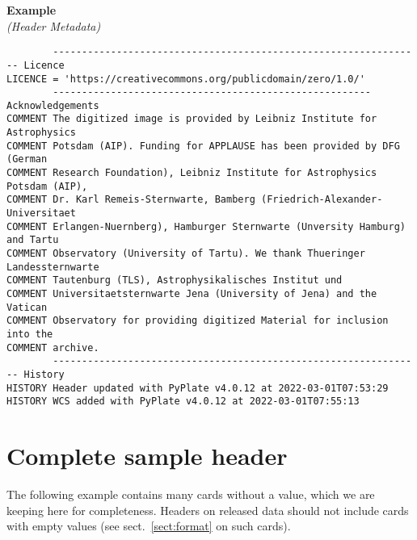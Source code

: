 \documentclass[11pt]{ivoa}
\newenvironment{fitsexample}[1]
{\bigskip\noindent\textbf{Example}\\\textit{(#1)\smallskip}}
{\medskip}
\begin{document}
\begin{fitsexample}{Header Metadata}
\begin{lstlisting}
        ---------------------------------------------------------------- Licence
LICENCE = 'https://creativecommons.org/publicdomain/zero/1.0/'
        ------------------------------------------------------- Acknowledgements
COMMENT The digitized image is provided by Leibniz Institute for Astrophysics
COMMENT Potsdam (AIP). Funding for APPLAUSE has been provided by DFG (German
COMMENT Research Foundation), Leibniz Institute for Astrophysics Potsdam (AIP),
COMMENT Dr. Karl Remeis-Sternwarte, Bamberg (Friedrich-Alexander-Universitaet
COMMENT Erlangen-Nuernberg), Hamburger Sternwarte (Unversity Hamburg) and Tartu
COMMENT Observatory (University of Tartu). We thank Thueringer Landessternwarte
COMMENT Tautenburg (TLS), Astrophysikalisches Institut und
COMMENT Universitaetsternwarte Jena (University of Jena) and the Vatican
COMMENT Observatory for providing digitized Material for inclusion into the
COMMENT archive.
        ---------------------------------------------------------------- History
HISTORY Header updated with PyPlate v4.0.12 at 2022-03-01T07:53:29
HISTORY WCS added with PyPlate v4.0.12 at 2022-03-01T07:55:13
\end{lstlisting}
\end{fitsexample}


\section{Complete sample header}
\label{sect:samplehdr}

The following example contains many cards without a value, which we are
keeping here for completeness.  Headers on released data should not
include cards with empty values (see sect.~\ref{sect:format} on such
cards).
\end{document}
